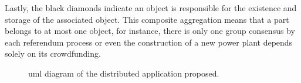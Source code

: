 Lastly, the black diamonds indicate an object is responsible for the existence and storage of the associated object.
This composite aggregation means that a part belongs to at most one object, for instance, there is only one group consensus by each referendum process or even the construction of a new power plant depends solely on its crowdfunding.

\begin{figure}{\textwidth}
    \centering
    \caption{\Gls{uml} diagram of the distributed application proposed.}
    \label{fig:uml}
\end{figure}


